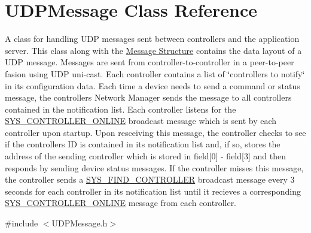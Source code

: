 \hypertarget{class_u_d_p_message}{}\section{U\+D\+P\+Message Class Reference}
\label{class_u_d_p_message}


A class for handling U\+DP messages sent between controllers and the application server. This class along with the \hyperlink{struct_u_d_p_message_struct}{Message Structure} contains the data layout of a U\+DP message. Messages are sent from controller-\/to-\/controller in a peer-\/to-\/peer fasion using U\+DP uni-\/cast. Each controller contains a list of \char`\"{}controllers to notify\char`\"{} in its configuration data. Each time a device needs to send a command or status message, the controller\textquotesingle{}s Network Manager sends the message to all controllers contained in the notification list. Each controller listens for the \hyperlink{group___u_d_p_message_i_d_ga23aab89076591390a1dbc412a3a07314}{S\+Y\+S\+\_\+\+C\+O\+N\+T\+R\+O\+L\+L\+E\+R\+\_\+\+O\+N\+L\+I\+NE} broadcast message which is sent by each controller upon startup. Upon resceiving this message, the controller checks to see if the controller\textquotesingle{}s ID is contained in its notification list and, if so, stores the address of the sending controller which is stored in field\mbox{[}0\mbox{]} -\/ field\mbox{[}3\mbox{]} and then responds by sending device status messages. If the controller misses this message, the controller sends a \hyperlink{group___u_d_p_message_i_d_gadfda0e5a5a6a08de555dd55182a4cd87}{S\+Y\+S\+\_\+\+F\+I\+N\+D\+\_\+\+C\+O\+N\+T\+R\+O\+L\+L\+ER} broadcast message every 3 seconds for each controller in its notification list until it recieves a corresponding \hyperlink{group___u_d_p_message_i_d_ga23aab89076591390a1dbc412a3a07314}{S\+Y\+S\+\_\+\+C\+O\+N\+T\+R\+O\+L\+L\+E\+R\+\_\+\+O\+N\+L\+I\+NE} message from each controller.  




{\ttfamily \#include $<$U\+D\+P\+Message.\+h$>$}

